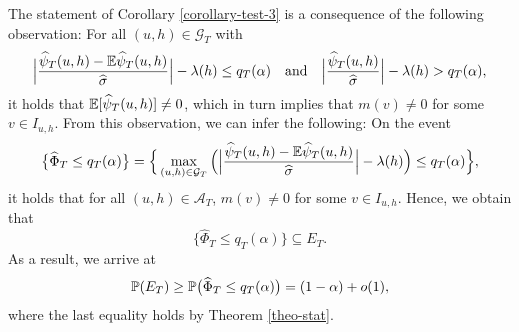 \documentclass[a4paper,12pt]{article}
\numberwithin{equation}{section}
\begin{document}
 
The statement of Corollary \ref{corollary-test-3} is a consequence of the following observation: For all $(u,h) \in \mathcal{G}_T$ with 
\[ \Big|\frac{\widehat{\psi}_T(u,h) - \mathbb{E} \widehat{\psi}_T(u,h)}{\widehat{\sigma}}\Big| - \lambda(h) \le q_T(\alpha) \quad \text{and} \quad \Big|\frac{\widehat{\psi}_T(u,h)}{\widehat{\sigma}}\Big| - \lambda(h) > q_T(\alpha), \]
it holds that $\mathbb{E}[\widehat{\psi}_T(u,h)] \ne 0$, which in turn implies that $m(v) \ne 0$ for some $v \in I_{u,h}$. From this observation, we can infer the following: On the event 
\[ \big\{ \widehat{\Phi}_T \le q_T(\alpha) \big\} = \Big\{ \max_{(u,h) \in \mathcal{G}_T} \Big( \Big|\frac{\widehat{\psi}_T(u,h) - \mathbb{E} \widehat{\psi}_T(u,h)}{\widehat{\sigma}}\Big| - \lambda(h) \Big) \le q_T(\alpha) \Big\}, \]
it holds that for all $(u,h) \in \mathcal{A}_T$, 
$m(v) \ne 0$ for some $v \in I_{u,h}$. Hence, we obtain that 
\[ \big\{ \widehat{\Phi}_T \le q_T(\alpha) \big\} \subseteq E_T. \]
As a result, we arrive at  
\[ \mathbb{P}(E_T) \ge \mathbb{P} \big(  \widehat{\Phi}_T \le q_T(\alpha) \big) = (1-\alpha) + o(1), \]
where the last equality holds by Theorem \ref{theo-stat}.
 




\newpage

{\small
\setlength{\bibsep}{0.55em}
}
\end{document}

